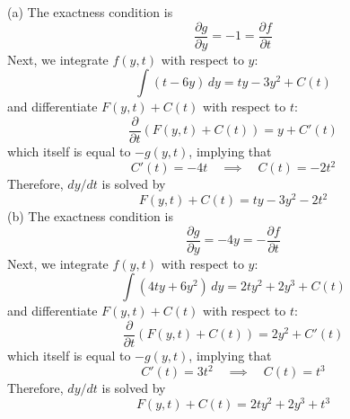 \documentclass[a4paper]{article}
\begin{document}
(a) The exactness condition is
\[
	\frac{\partial g}{\partial y} = -1 = \frac{\partial f}{\partial t} 
\]
Next, we integrate \(f \!\left( y,t \right) \) with respect to \(y\):
\[
	\int \!\left( t - 6y \right) \, dy = ty - 3y^{2} + C \!\left( t \right) 
\]
and differentiate \(F \!\left( y,t \right) + C \!\left( t \right) \) with respect to \(t\):
\[
	\frac{\partial }{\partial t} \!\left( F \!\left( y,t \right) + C \!\left( t \right)  \right) = y + C'\!\left( t \right) 
\]
which itself is equal to \(-g \!\left( y,t \right) \), implying that
\[
	C'\!\left( t \right) = -4t \quad \implies \quad C \!\left( t \right) = -2t^{2}
\]
Therefore, \(dy/dt\) is solved by
\[
	F \!\left( y,t \right) + C \!\left( t \right) = ty - 3y^{2} - 2t^{2}
\]
(b) The exactness condition is
\[
	\frac{\partial g}{\partial y} = -4y = -\frac{\partial f}{\partial t} 
\]
Next, we integrate \(f \!\left( y,t \right) \) with respect to \(y\):
\[
	\int \!\left( 4ty + 6y^{2} \right) \, dy = 2ty^{2} + 2y^{3} + C \!\left( t \right) 
\]
and differentiate \(F \!\left( y,t \right) + C \!\left( t \right) \) with respect to \(t\):
\[
	\frac{\partial }{\partial t} \!\left( F \!\left( y,t \right) + C \!\left( t \right)  \right) = 2y^{2} + C'\!\left( t \right)  
\]
which itself is equal to \(-g \!\left( y,t \right) \), implying that
\[
	C'\!\left( t \right) = 3t^{2} \quad \implies \quad C \!\left( t \right) = t^{3}
\]
Therefore, \(dy/dt\) is solved by
\[
	F \!\left( y,t \right) + C \!\left( t \right) = 2ty^{2} + 2y^{3} + t^{3}
\]
\end{document}

